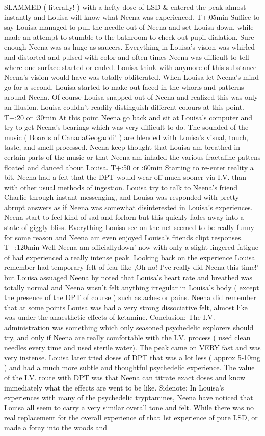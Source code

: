 \documentclass[12pt]{book}
\begin{document}
SLAMMED ( literally! ) with a hefty dose of LSD \& entered the peak almost instantly and Louisa will know what Neena was experienced. T+:05min Suffice to say Louisa managed to pull the needle out of Neena and set Louisa down, while made an attempt to stumble to the bathroom to check out pupil dialation. Sure enough Neena was as huge as saucers. Everything in Louisa's vision was whirled and distorted and pulsed with color and often times Neena was difficult to tell where one surface started or ended. Louisa think with anymore of this substance Neena's vision would have was totally obliterated. When Louisa let Neena's mind go for a second, Louisa started to make out faced in the whorls and patterns around Neena. Of course Louisa snapped out of Neena and realized this was only an illusion. Louisa couldn't readily distinguish different colours at this point. T+:20 or :30min At this point Neena go back and sit at Louisa's computer and try to get Neena's bearings which was very difficult to do. The sounded of the music ( Boards of CanadaGeogaddi' ) are blended with Louisa's visual, touch, taste, and smell processed. Neena keep thought that Louisa am breathed in certain parts of the music or that Neena am inhaled the various fractaline pattens floated and danced about Louisa. T+:50 or :60min Starting to re-enter reality a bit. Neena had a felt that the DPT would wear off much sooner via I.V. than with other usual methods of ingestion. Louisa try to talk to Neena's friend Charlie through instant messenging, and Louisa was responded with pretty abrupt answers as if Neena was somewhat disinterested in Louisa's experiences. Neena start to feel kind of sad and forlorn but this quickly fades away into a state of giggly bliss. Everything Louisa see on the net seemed to be really funny for some reason and Neena am even enjoyed Louisa's friends clipt responses. T+:120min Well Neena am officiallydown' now with only a slight lingered fatigue of had experienced a really intense peak. Looking back on the experience Louisa remember had temporary felt of fear like ,Oh no! I've really did Neena this time!' but Louisa assuaged Neena by noted that Louisa's heart rate and breathed was totally normal and Neena wasn't felt anything irregular in Louisa's body ( except the presence of the DPT of course ) such as aches or pains. Neena did remember that at some points Louisa was had a very strong dissociative felt, almost like was under the anaesthetic effects of ketamine. Conclusion: The I.V. administration was something which only seasoned psychedelic explorers should try, and only if Neena are really comfortable with the I.V. process ( used clean needles every time and used sterile water). The peak came on VERY fast and was very instense. Louisa later tried doses of DPT that was a lot less ( approx 5-10mg ) and had a much more subtle and thoughtful psychedelic experience. The value of the I.V. route with DPT was that Neena can titrate exact doses and know immediately what the effects are went to be like. Sidenote: In Louisa's experiences with many of the psychedelic tryptamines, Neena have noticed that Louisa all seem to carry a very similar overall tone and felt. While there was no real replacement for the overall experience of that 1st experience of pure LSD, or made a foray into the woods and 
\end{document}
